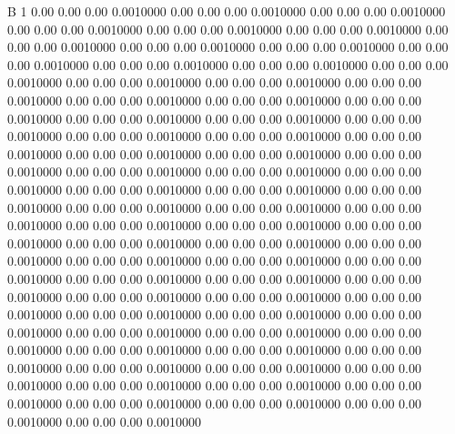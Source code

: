 


B 1
   0.00    0.00    0.00   0.0010000
   0.00    0.00    0.00   0.0010000
   0.00    0.00    0.00   0.0010000
   0.00    0.00    0.00   0.0010000
   0.00    0.00    0.00   0.0010000
   0.00    0.00    0.00   0.0010000
   0.00    0.00    0.00   0.0010000
   0.00    0.00    0.00   0.0010000
   0.00    0.00    0.00   0.0010000
   0.00    0.00    0.00   0.0010000
   0.00    0.00    0.00   0.0010000
   0.00    0.00    0.00   0.0010000
   0.00    0.00    0.00   0.0010000
   0.00    0.00    0.00   0.0010000
   0.00    0.00    0.00   0.0010000
   0.00    0.00    0.00   0.0010000
   0.00    0.00    0.00   0.0010000
   0.00    0.00    0.00   0.0010000
   0.00    0.00    0.00   0.0010000
   0.00    0.00    0.00   0.0010000
   0.00    0.00    0.00   0.0010000
   0.00    0.00    0.00   0.0010000
   0.00    0.00    0.00   0.0010000
   0.00    0.00    0.00   0.0010000
   0.00    0.00    0.00   0.0010000
   0.00    0.00    0.00   0.0010000
   0.00    0.00    0.00   0.0010000
   0.00    0.00    0.00   0.0010000
   0.00    0.00    0.00   0.0010000
   0.00    0.00    0.00   0.0010000
   0.00    0.00    0.00   0.0010000
   0.00    0.00    0.00   0.0010000
   0.00    0.00    0.00   0.0010000
   0.00    0.00    0.00   0.0010000
   0.00    0.00    0.00   0.0010000
   0.00    0.00    0.00   0.0010000
   0.00    0.00    0.00   0.0010000
   0.00    0.00    0.00   0.0010000
   0.00    0.00    0.00   0.0010000
   0.00    0.00    0.00   0.0010000
   0.00    0.00    0.00   0.0010000
   0.00    0.00    0.00   0.0010000
   0.00    0.00    0.00   0.0010000
   0.00    0.00    0.00   0.0010000
   0.00    0.00    0.00   0.0010000
   0.00    0.00    0.00   0.0010000
   0.00    0.00    0.00   0.0010000
   0.00    0.00    0.00   0.0010000
   0.00    0.00    0.00   0.0010000
   0.00    0.00    0.00   0.0010000
   0.00    0.00    0.00   0.0010000
   0.00    0.00    0.00   0.0010000
   0.00    0.00    0.00   0.0010000
   0.00    0.00    0.00   0.0010000
   0.00    0.00    0.00   0.0010000
   0.00    0.00    0.00   0.0010000
   0.00    0.00    0.00   0.0010000
   0.00    0.00    0.00   0.0010000
   0.00    0.00    0.00   0.0010000
   0.00    0.00    0.00   0.0010000
   0.00    0.00    0.00   0.0010000
   0.00    0.00    0.00   0.0010000
   0.00    0.00    0.00   0.0010000
   0.00    0.00    0.00   0.0010000
   0.00    0.00    0.00   0.0010000
   0.00    0.00    0.00   0.0010000
   0.00    0.00    0.00   0.0010000
   0.00    0.00    0.00   0.0010000
   0.00    0.00    0.00   0.0010000
   0.00    0.00    0.00   0.0010000
   0.00    0.00    0.00   0.0010000
